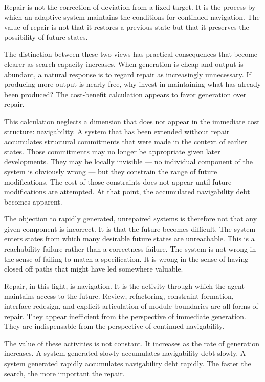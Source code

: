\begin{principle}
Repair is not the correction of deviation from a fixed target. It is the
process by which an adaptive system maintains the conditions for continued
navigation. The value of repair is not that it restores a previous state but
that it preserves the possibility of future states.
\end{principle}

The distinction between these two views has practical consequences that become
clearer as search capacity increases. When generation is cheap and output is
abundant, a natural response is to regard repair as increasingly unnecessary.
If producing more output is nearly free, why invest in maintaining what has
already been produced? The cost-benefit calculation appears to favor generation
over repair.

This calculation neglects a dimension that does not appear in the immediate
cost structure: navigability. A system that has been extended without repair
accumulates structural commitments that were made in the context of earlier
states. Those commitments may no longer be appropriate given later developments.
They may be locally invisible --- no individual component of the system is
obviously wrong --- but they constrain the range of future modifications.
The cost of those constraints does not appear until future modifications are
attempted. At that point, the accumulated navigability debt becomes apparent.

The objection to rapidly generated, unrepaired systems is therefore not that
any given component is incorrect. It is that the future becomes difficult.
The system enters states from which many desirable future states are unreachable.
This is a reachability failure rather than a correctness failure. The system
is not wrong in the sense of failing to match a specification. It is wrong in
the sense of having closed off paths that might have led somewhere valuable.

Repair, in this light, is navigation. It is the activity through which the
agent maintains access to the future. Review, refactoring, constraint formation,
interface redesign, and explicit articulation of module boundaries are all
forms of repair. They appear inefficient from the perspective of immediate
generation. They are indispensable from the perspective of continued navigability.

The value of these activities is not constant. It increases as the rate of
generation increases. A system generated slowly accumulates navigability debt
slowly. A system generated rapidly accumulates navigability debt rapidly.
The faster the search, the more important the repair.


